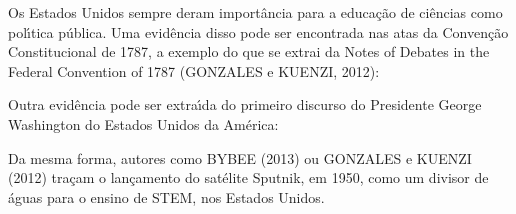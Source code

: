 \documentclass[
12pt,		%
openright,	%
twoside,  %
a4paper,			%
chapter=TITLE,		%
english,			%
french,				%
spanish,			%
brazil				%
]{USPSC-classe/USPSC}
\begin{document}
Os Estados Unidos sempre deram import\^ancia para a educa\c{c}\~ao de ci\^encias como pol\'{\i}tica p\'ublica. Uma evid\^encia disso pode ser encontrada nas atas da Conven\c{c}\~ao Constitucional de 1787, a exemplo do que se extrai da \textquotedbl Notes of Debates in the Federal Convention of 1787  (GONZALES e KUENZI, 2012):


















\noindent\begin{center}\mbox{\centering{}}\end{center}


Outra evid\^encia pode ser extra\'{\i}da do primeiro discurso do Presidente George Washington do Estados Unidos da Am\'erica:


















\noindent\begin{center}\mbox{\centering{}}\end{center}


Da mesma forma, autores como  BYBEE (2013)  ou  GONZALES e KUENZI (2012) tra\c{c}am o lan\c{c}amento do sat\'elite Sputnik, em 1950, como um divisor de \'aguas para o ensino de STEM, nos Estados Unidos.
\end{document}
